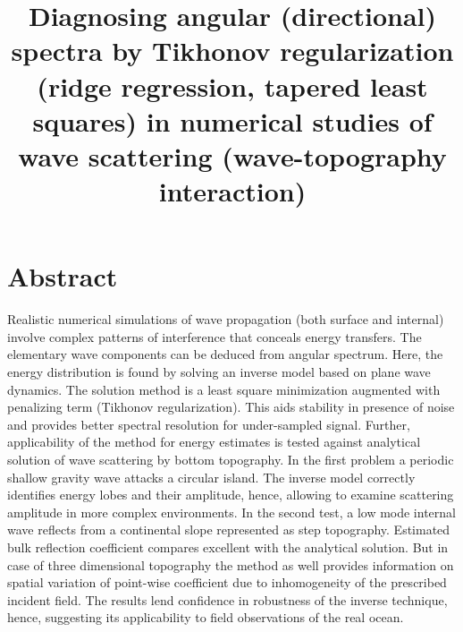 



\title{Diagnosing angular (directional) spectra by Tikhonov regularization (ridge regression, tapered least squares) in numerical studies of wave scattering (wave-topography interaction)}
\maketitle

\section*{Abstract}
Realistic numerical simulations of wave propagation (both surface and internal) involve complex patterns of interference that conceals energy transfers. The elementary wave components can be deduced from angular spectrum. Here, the energy distribution is found by solving an inverse model based on plane wave dynamics. The solution method is a least square minimization augmented with penalizing term (Tikhonov regularization). This aids stability in presence of noise and provides better spectral resolution for under-sampled signal. Further, applicability of the method for energy estimates is tested against analytical solution of wave scattering by bottom topography. In the first problem a periodic shallow gravity wave attacks a circular island. The inverse model correctly identifies energy lobes and their amplitude, hence, allowing to examine scattering amplitude in more complex environments. In the second test, a low mode internal wave reflects from a continental slope represented as step topography. Estimated bulk reflection coefficient compares excellent with the analytical solution. But in case of three dimensional topography the method as well provides information on spatial variation of point-wise coefficient due to inhomogeneity of the prescribed incident field. The results lend confidence in robustness of the inverse technique, hence, suggesting its applicability to field observations of the real ocean.

